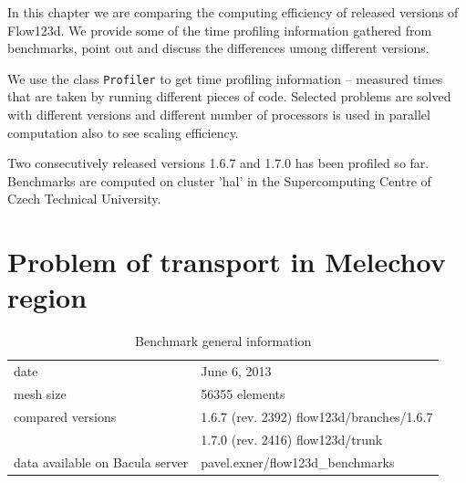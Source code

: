 %
%
%
%
%
%
%
%


In this chapter we are comparing the computing efficiency of released versions of Flow123d. We provide some 
of the time profiling information gathered from benchmarks, point out and discuss the differences umong different 
versions.

We use the class \verb'Profiler' to get time profiling information -- measured times that are taken by running different 
pieces of code. Selected problems are solved with different versions and different number 
of processors is used in parallel computation also to see scaling efficiency.

Two consecutively released versions 1.6.7 and 1.7.0 has been profiled so far. 
Benchmarks are computed on cluster 'hal' in the Supercomputing Centre of Czech Technical University.


\section{Problem of transport in Melechov region}

\begin{table}[!htb]
\centering
\begin{tabular}{ll}
date & June 6, 2013 \\
mesh size & 56355 elements \\
compared versions & 1.6.7 (rev. 2392) flow123d/branches/1.6.7 \\
                  & 1.7.0 (rev. 2416) flow123d/trunk \\
data available on Bacula server & pavel.exner/flow123d\_benchmarks
\end{tabular}
\caption{Benchmark general information}
\label{tab:bench1}
\end{table}

